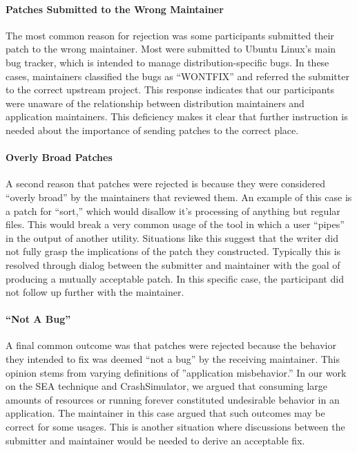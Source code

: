 \paragraph{Patches Submitted to the Wrong Maintainer}
The most common reason for rejection was some participants submitted their patch to the wrong maintainer.
Most were submitted to Ubuntu Linux's main bug tracker, which is intended to manage distribution-specific bugs.
In these cases,
maintainers classified the bugs as ``WONTFIX'' and referred the submitter to the correct upstream project.
This response indicates that our participants were unaware of the relationship between distribution maintainers and application maintainers.
This deficiency makes it clear that further instruction is needed about the importance of sending patches to the correct place.

\paragraph{Overly Broad Patches}
A second reason that patches were rejected is because they were considered ``overly broad'' by the maintainers that reviewed them.
An example of this case is a patch for ``sort,'' which would disallow it's processing of anything but regular files.
This would break a very common usage of the tool in which a user ``pipes'' in the output of another utility.
Situations like this suggest that the writer did not fully grasp the implications of the patch they constructed.
Typically this is resolved through dialog between the submitter and maintainer with the goal of producing a mutually acceptable patch.
In this specific case, the participant did not follow up further with the maintainer.

\paragraph{``Not A Bug''}
A final common outcome was that patches were rejected because the behavior they intended to fix was deemed ``not a bug'' by the receiving maintainer.
This opinion stems from varying definitions of ''application misbehavior.''
In our work on the SEA technique and CrashSimulator, we argued that  consuming large amounts of resources or running forever constituted undesirable behavior in an application.
The maintainer in this case argued that such outcomes may be correct
for some usages.
This is another situation where discussions between the submitter and maintainer would be needed to derive an acceptable fix.

